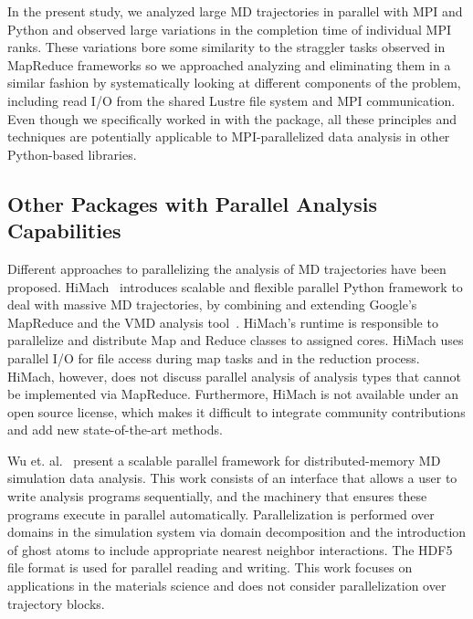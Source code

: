 In the present study, we analyzed large MD trajectories in parallel with MPI and Python and observed large variations in the completion time of individual MPI ranks.
These variations bore some similarity to the straggler tasks observed in MapReduce frameworks so we approached analyzing and eliminating them in a similar fashion by systematically looking at different components of the problem, including read I/O from the shared Lustre file system and MPI communication.
Even though we specifically worked in with the  package, all these principles and techniques are potentially applicable to MPI-parallelized data analysis in other Python-based libraries.


\subsection{Other Packages with Parallel Analysis Capabilities}
\label{sec:otherparallel}

Different approaches to parallelizing the analysis of MD trajectories have been proposed.
HiMach~\cite{himach-2008} introduces scalable and flexible parallel Python framework to deal with massive MD trajectories, by combining and extending Google's MapReduce and the VMD analysis tool~\cite{Hum96}. 
HiMach's runtime is responsible to parallelize and distribute Map and Reduce classes to assigned cores.
HiMach uses parallel I/O for file access during map tasks and  in the reduction process. 
HiMach, however, does not discuss parallel analysis of analysis types that cannot be implemented via MapReduce.
Furthermore, HiMach is not available under an open source license, which makes it difficult to integrate community contributions and add new state-of-the-art methods.

Wu et. al.~\cite{Wu_et.al} present a scalable parallel framework for distributed-memory MD simulation data analysis.
This work consists of an interface that allows a user to write analysis programs sequentially, and the machinery that ensures these programs execute in parallel automatically. 
Parallelization is performed over domains in the simulation system via domain decomposition and the introduction of ghost atoms to include appropriate nearest neighbor interactions.
The HDF5 file format is used for parallel reading and writing.
This work focuses on applications in the materials science and does not consider parallelization over trajectory blocks.

